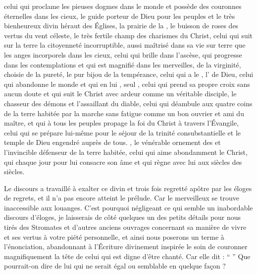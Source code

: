 celui qui proclame les pieuses dogmes dans le monde et possède des couronnes éternelles dans les cieux, 
le guide porteur de Dieu pour les peuples et le très bienheureux divin héraut des Églises,
la prairie de la ,
le buisson de roses des vertus du vent céleste,
le très fertile champ  des charismes du Christ,
celui qui suit sur la terre la citoyenneté incorruptible, aussi maîtrisé dans sa vie sur terre  que les anges incorporels dans les cieux, %
celui qui brille dans l'ascèse, qui progresse dans les contemplations et qui est magnifié dans les merveilles, %
 de la virginité,
 choisie de la pureté, %
le pur bijou de la tempérance,
celui qui a le ,
l' de Dieu,
celui qui abandonne le monde et qui en lui ,
 seul ,
celui qui  prend sa propre croix sans aucun doute et qui suit le Christ avec ardeur comme un véritable disciple, 
le chasseur des démons et l'assaillant du diable,
celui qui déambule aux quatre coins de la terre habitée par la marche sans fatigue comme un bon ouvrier et ami du maître, 
et qui à tous les peuples propage la foi du Christ à travers l'Évangile,
celui qui se prépare lui-même pour le séjour de la trinité consubstantielle et le temple de Dieu engendré auprès de tous.
, le vénérable ornement des  et l'invincible défenseur de la terre habitée,
celui qui aime abondamment le Christ, qui  chaque jour  pour lui consacre son âme et qui règne avec lui aux siècles des siècles. %

Le discours a travaillé à exalter ce divin et trois fois regretté apôtre  par les éloges de regrets, et il n'a pas encore atteint le prélude.
Car le  merveilleux  se trouve inaccessible aux louanges. %
C'est pourquoi négligeant %
ce qui semble un inabordable discours d'éloges,
 je laisserais  de côté  quelques un des petits détails pour nous tirés des Stromates et d'autres anciens ouvrages  concernant sa manière de vivre et ses vertus  à votre piété personnelle, et ainsi nous poserons un terme à l'énonciation,
abandonnant  à l'Écriture divinement inspirée le soin de couronner magnifiquement la tête de celui qui est digne d'être chanté. %
Car elle dit : \enquote{ }
Que pourrait-on dire de lui qui ne serait égal ou semblable en quelque façon ?

